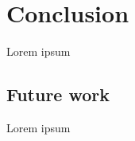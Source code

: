 \chapter{Conclusion}
\label{sec:conclusion}

Lorem ipsum



\section{Future work}

Lorem ipsum








